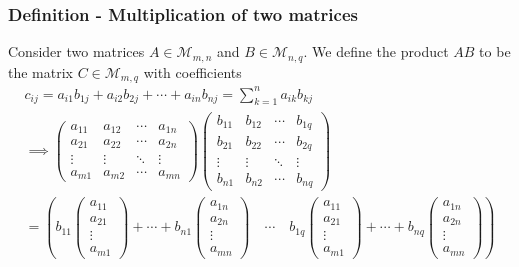 \documentclass[usenames,dvipsnames,aspectratio=169,10pt]{beamer}
\numberwithin{equation}{section}
\begin{document}
\begin{frame}
\frametitle{Definition - Multiplication of two matrices}
Consider two matrices $A \in \mathcal{M}_{m,n}$ and $B \in \mathcal{M}_{n,q}$. We define the product $AB$ to be the matrix $C\in\mathcal{M}_{m,q}$ with coefficients
\begin{gather*}
c_{ij} = a_{i1}b_{1j} + a_{i2}b_{2j} + \cdots + a_{in}b_{nj} = \sum_{k=1}^n a_{ik} b_{kj} \\
\implies
\begin{pmatrix}
a_{11} & a_{12} & \cdots & a_{1n} \\
a_{21} & a_{22} & \cdots & a_{2n} \\
\vdots & \vdots & \ddots & \vdots \\
a_{m1} & a_{m2} & \cdots & a_{mn}
\end{pmatrix}
\begin{pmatrix}
b_{11} & b_{12} & \cdots & b_{1q} \\
b_{21} & b_{22} & \cdots & b_{2q} \\
\vdots & \vdots & \ddots & \vdots \\
b_{n1} & b_{n2} & \cdots & b_{nq}
\end{pmatrix} \\
=
\left(
b_{11}
\begin{pmatrix}
a_{11} \\
a_{21} \\
\vdots \\
a_{m1} 
\end{pmatrix}
+ \cdots +
b_{n1}
\begin{pmatrix}
a_{1n} \\
a_{2n} \\
\vdots \\
a_{mn} 
\end{pmatrix}
\quad \cdots \quad 
b_{1q}
\begin{pmatrix}
a_{11} \\
a_{21} \\
\vdots \\
a_{m1} 
\end{pmatrix}
+ \cdots +
b_{nq}
\begin{pmatrix}
a_{1n} \\
a_{2n} \\
\vdots \\
a_{mn} 
\end{pmatrix}
\right)
\end{gather*}

\end{frame}
\end{document}
